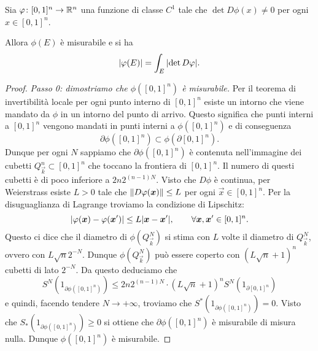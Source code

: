 \begin{theorem}
Sia $\varphi\colon [0,1]^n \to {\mathbb R}^n$
una funzione di classe $C^1$ tale che $\det D\phi(x)\neq 0$ per ogni $x\in [0,1]^n$.

Allora $\phi(E)$ è misurabile e si ha
\begin{equation}\label{eq:area}
 {\left|\varphi(E)\right|} = \int_E {\left|\det D\varphi\right|}.
\end{equation}
\end{theorem}
%
\begin{proof}
\emph{Passo 0: dimostriamo che $\phi([0,1]^n)$ è misurabile.}
Per il teorema di invertibilità locale per ogni punto interno di $[0,1]^n$
esiste un intorno che viene mandato da $\phi$ in un intorno del punto di arrivo.
Questo significa che punti interni a $[0,1]^n$ vengono mandati in punti interni a $\phi([0,1]^n)$
e di conseguenza 
\[
  \partial \phi([0,1]^n) \subset \phi(\partial [0,1]^n).
\]
Dunque per ogni $N$ sappiamo che $\partial \phi([0,1]^n)$ è contenuta nell'immagine 
dei cubetti $Q^n_{\vec k}\subset [0,1]^n$ che toccano la frontiera di $[0,1]^n$.
Il numero di questi cubetti è di poco inferiore a $2n 2^{(n-1)N}$.
Visto che $D\phi$ è continua, per Weierstrass esiste $L>0$ tale che ${\left\Vert D\varphi(\boldsymbol x)\right\Vert} \le L$ per ogni $\vec x\in [0,1]^n$.
Per la disuguaglianza di Lagrange troviamo la condizione di Lipschitz:
\[
{\left|\varphi(\boldsymbol x) - \varphi(\boldsymbol x')\right|} \le L {\left|\boldsymbol x - \boldsymbol x'\right|}, \qquad \forall \boldsymbol x,\boldsymbol x' \in [0,1]^n.
\]
Questo ci dice che il diametro di $\phi(Q^N_{\vec k})$ si stima con $L$ volte il diametro di $Q^N_{\vec k}$,
ovvero con $L \sqrt n 2^{-N}$.
Dunque $\phi(Q^N_{\vec k})$ può essere coperto con $(L\sqrt n +1)^n$ cubetti di lato $2^{-N}$.
Da questo deduciamo che 
\[
  S^N(1_{\partial \phi([0,1]^n)}) \le 2n 2^{(n-1)N}\cdot (L\sqrt n + 1)^n S^N(1_{\partial [0,1]^n})
\]
e quindi, facendo tendere $N\to +\infty$, troviamo che $S^*(1_{\partial \phi([0,1]^n)}) = 0$.
Visto che $S_*(1_{\partial \phi([0,1]^n)}) \ge 0$ si ottiene che $\partial \phi([0,1]^n)$ è misurabile 
di misura nulla. Dunque $\phi([0,1]^n)$ è misurabile.


\end{proof}
